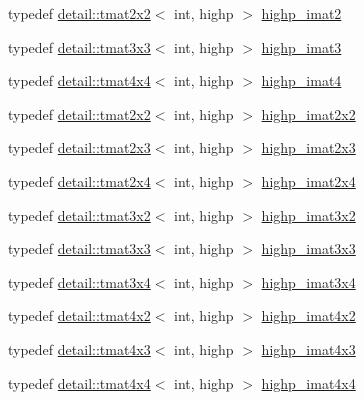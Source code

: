 \begin{DoxyCompactItemize}
\item 
typedef \hyperlink{structglm_1_1detail_1_1tmat2x2}{detail\+::tmat2x2}$<$ int, highp $>$ \hyperlink{group__gtc__matrix__integer_ga70eae282157f23589db24f4664bbf956}{highp\+\_\+imat2}
\item 
typedef \hyperlink{structglm_1_1detail_1_1tmat3x3}{detail\+::tmat3x3}$<$ int, highp $>$ \hyperlink{group__gtc__matrix__integer_gaf12b3aa7e16a88b1fcf51be9a132048c}{highp\+\_\+imat3}
\item 
typedef \hyperlink{structglm_1_1detail_1_1tmat4x4}{detail\+::tmat4x4}$<$ int, highp $>$ \hyperlink{group__gtc__matrix__integer_ga9ca2f5624891bd1ac993fcde4dd24ac1}{highp\+\_\+imat4}
\item 
typedef \hyperlink{structglm_1_1detail_1_1tmat2x2}{detail\+::tmat2x2}$<$ int, highp $>$ \hyperlink{group__gtc__matrix__integer_ga9646ff5ef973234755e63e727c5a37fc}{highp\+\_\+imat2x2}
\item 
typedef \hyperlink{structglm_1_1detail_1_1tmat2x3}{detail\+::tmat2x3}$<$ int, highp $>$ \hyperlink{group__gtc__matrix__integer_ga7b7079ab95ac8f533ac565fcf1341c76}{highp\+\_\+imat2x3}
\item 
typedef \hyperlink{structglm_1_1detail_1_1tmat2x4}{detail\+::tmat2x4}$<$ int, highp $>$ \hyperlink{group__gtc__matrix__integer_ga84aec2e744ecac589fe8d502266e8efc}{highp\+\_\+imat2x4}
\item 
typedef \hyperlink{structglm_1_1detail_1_1tmat3x2}{detail\+::tmat3x2}$<$ int, highp $>$ \hyperlink{group__gtc__matrix__integer_ga9780c1bc052a34c59dc95f4dd9e1a5c8}{highp\+\_\+imat3x2}
\item 
typedef \hyperlink{structglm_1_1detail_1_1tmat3x3}{detail\+::tmat3x3}$<$ int, highp $>$ \hyperlink{group__gtc__matrix__integer_ga4e7c11e49de5d71067b95a87c84308a8}{highp\+\_\+imat3x3}
\item 
typedef \hyperlink{structglm_1_1detail_1_1tmat3x4}{detail\+::tmat3x4}$<$ int, highp $>$ \hyperlink{group__gtc__matrix__integer_ga97ddf84f7ae0c5d4d3ecc18bb1d47449}{highp\+\_\+imat3x4}
\item 
typedef \hyperlink{structglm_1_1detail_1_1tmat4x2}{detail\+::tmat4x2}$<$ int, highp $>$ \hyperlink{group__gtc__matrix__integer_gad998dce143f674a95a25241ff6e5e7d2}{highp\+\_\+imat4x2}
\item 
typedef \hyperlink{structglm_1_1detail_1_1tmat4x3}{detail\+::tmat4x3}$<$ int, highp $>$ \hyperlink{group__gtc__matrix__integer_ga9d51b6f1c8cd0b23c6fcc8dca924b14c}{highp\+\_\+imat4x3}
\item 
typedef \hyperlink{structglm_1_1detail_1_1tmat4x4}{detail\+::tmat4x4}$<$ int, highp $>$ \hyperlink{group__gtc__matrix__integer_ga969c88d5c7530beb80768205a054ee80}{highp\+\_\+imat4x4}

\end{DoxyCompactItemize}
